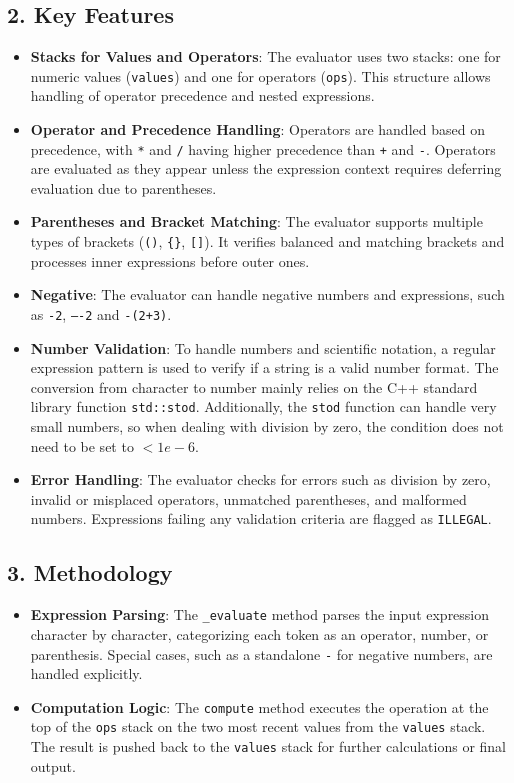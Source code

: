 \documentclass[a4paper]{article}
\begin{document}
\subsection*{2. Key Features}
\begin{itemize}
    \item \textbf{Stacks for Values and Operators}: The evaluator uses two stacks: one for numeric values (\texttt{values}) and one for operators (\texttt{ops}). This structure allows handling of operator precedence and nested expressions.
    \item \textbf{Operator and Precedence Handling}: Operators are handled based on precedence, with \texttt{*} and \texttt{/} having higher precedence than \texttt{+} and \texttt{-}. Operators are evaluated as they appear unless the expression context requires deferring evaluation due to parentheses.
    \item \textbf{Parentheses and Bracket Matching}: The evaluator supports multiple types of brackets (\texttt{()}, \texttt{\{\}}, \texttt{[]}). It verifies balanced and matching brackets and processes inner expressions before outer ones.
    \item \textbf{Negative}: The evaluator can handle negative numbers and expressions, such as \texttt{-2}, \texttt{----2} and \texttt{-(2+3)}.
    \item \textbf{Number Validation}: To handle numbers and scientific notation, a regular expression pattern is used to verify if a string is a valid number format. The conversion from character to number mainly relies on the C++ standard library function \texttt{std::stod}. Additionally, the \texttt{stod} function can handle very small numbers, so when dealing with division by zero, the condition does not need to be set to $< 1e-6$.
    \item \textbf{Error Handling}: The evaluator checks for errors such as division by zero, invalid or misplaced operators, unmatched parentheses, and malformed numbers. Expressions failing any validation criteria are flagged as \texttt{ILLEGAL}.
\end{itemize}

\subsection*{3. Methodology}
\begin{itemize}
    \item \textbf{Expression Parsing}: The \texttt{\_evaluate} method parses the input expression character by character, categorizing each token as an operator, number, or parenthesis. Special cases, such as a standalone \texttt{-} for negative numbers, are handled explicitly.
    \item \textbf{Computation Logic}: The \texttt{compute} method executes the operation at the top of the \texttt{ops} stack on the two most recent values from the \texttt{values} stack. The result is pushed back to the \texttt{values} stack for further calculations or final output.
\end{itemize}
\end{document}
